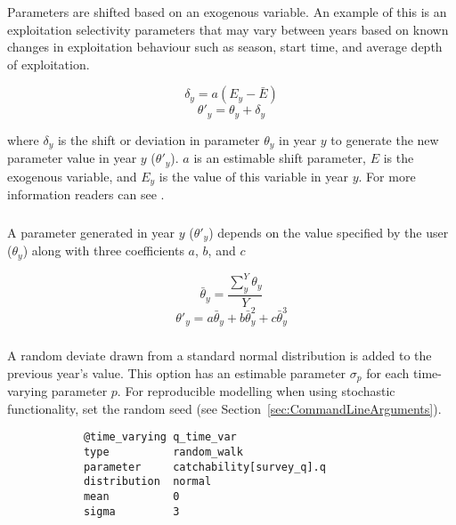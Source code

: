 Parameters are shifted based on an exogenous variable. An example of this is an exploitation selectivity parameters that may vary between years based on known changes in exploitation behaviour such as season, start time, and average depth of exploitation.

\begin{equation}
	\delta_y = a(E_y - \bar{E})
\end{equation}
\begin{equation}
	\theta'_y = \theta_y + \delta_y
\end{equation}

where $\delta_y$ is the shift or deviation in parameter $\theta_y$ in year $y$ to generate the new parameter value in year $y$ ($\theta'_y$). $a$ is an estimable shift parameter, $E$ is the exogenous variable, and $E_y$ is the value of this variable in year $y$. For more information readers can see \cite{francis_03}.

\subsubsection[Annual shift]{} \label{sec:TimeVarying-AnnualShift}

A parameter generated in year $y$ ($\theta'_y$) depends on the value specified by the user ($\theta_y$) along with three coefficients $a$, $b$, and $c$

\begin{equation}
	\bar{\theta}_y = \frac{\sum_{y}^Y\theta_y}{Y}
\end{equation}
\begin{equation}
	\theta'_y = a \bar{\theta}_y + b\bar{\theta}_y^{2} + c\bar{\theta}_y^{3}
\end{equation}

\subsubsection[Random Walk]{}\label{sec:TimeVarying-RandomWalk}

A random deviate drawn from a standard normal distribution is added to the previous year's value. This option has an estimable parameter $\sigma_p$ for each time-varying parameter $p$. For reproducible modelling when using stochastic functionality, set the random seed (see Section~\ref{sec:CommandLineArguments}).

{\small{\begin{verbatim}
			@time_varying q_time_var
			type          random_walk
			parameter     catchability[survey_q].q
			distribution  normal
			mean          0
			sigma         3
\end{verbatim}}}

